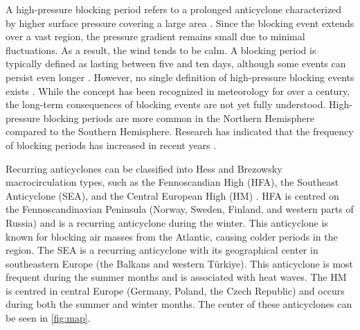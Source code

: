 A high-pressure blocking period refers to a prolonged anticyclone characterized by higher surface pressure covering a large area \cite{lupoAtmosphericBlockingEvents2020}. Since the blocking event extends over a vast region, the pressure gradient remains small due to minimal fluctuations. As a result, the wind tends to be calm. A blocking period is typically defined as lasting between five and ten days, although some events can persist even longer \cite{porebskaAnalysisExtremeTemperature2013}. However, no single definition of high-pressure blocking events exists \cite{lupoAtmosphericBlockingEvents2020}. While the concept has been recognized in meteorology for over a century, the long-term consequences of blocking events are not yet fully understood. High-pressure blocking periods are more common in the Northern Hemisphere compared to the Southern Hemisphere. Research has indicated that the frequency of blocking periods has increased in recent years \cite{lupoAtmosphericBlockingEvents2020}. 

Recurring anticyclones can be classified into Hess and Brezowsky macrocirculation types, such as the Fennoscandian High (HFA), the Southeast Anticyclone (SEA), and the Central European High (HM) \cite{bartholyEuropeanCycloneTrack2006}. HFA is centred on the Fennoscandinavian Peninsula (Norway, Sweden, Finland, and western parts of Russia) and is a recurring anticyclone during the winter. This anticyclone is known for blocking air masses from the Atlantic, causing colder periods in the region. The SEA is a recurring anticyclone with its geographical center in southeastern Europe (the Balkans and western Türkiye). This anticyclone is most frequent during the summer months and is associated with heat waves. The HM is centred in central Europe (Germany, Poland, the Czech Republic) and occurs during both the summer and winter months. The center of these anticyclones can be seen in \autoref{fig:map}. 

